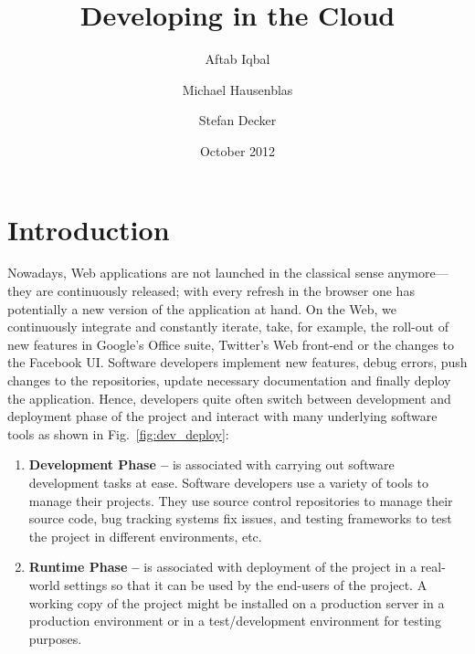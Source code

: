 \documentclass[11pt,fleqn,twoside]{article}
\title{Developing in the Cloud}
\author{
Aftab Iqbal\affiliation{
DERI, National University of Ireland, Galway, Ireland.
\mbox{firstname.lastname@deri.org}
}
\and
Michael Hausenblas\footnotemark[1]
\and
Stefan Decker\footnotemark[1]
}
\date{October 2012}
\begin{document}
%
%

\maketitle

\newpage
{}

{\small

\tableofcontents
}


\newpage
{}


\section{Introduction}

Nowadays, Web applications are not launched in the classical sense anymore---they are continuously released; with every refresh in the browser one has potentially a new version of the application at hand. On the Web, we continuously integrate and constantly iterate, take, for example, the roll-out of new features in Google's Office suite, Twitter's Web front-end or the changes to the Facebook UI. Software developers implement new features, debug errors, push changes to the repositories, update necessary documentation and finally deploy the application. Hence, developers quite often switch between development and deployment phase of the project and interact with many underlying software tools as shown in Fig.~\ref{fig:dev_deploy}:
\begin{enumerate}
	\item \textbf{Development Phase --} is associated with carrying out software development tasks at ease. Software developers use a variety of tools to manage their projects. They use source control repositories to manage their source code, bug tracking systems fix issues, and testing frameworks to test the project in different environments, etc.
	\item \textbf{Runtime Phase --} is associated with deployment of the project in a real-world settings so that it can be used by the end-users of the project. A working copy of the project might be installed on a production server in a production environment or in a test/development environment for testing purposes.
\end{enumerate}
\end{document}
